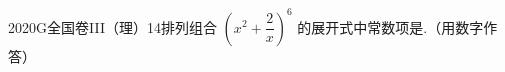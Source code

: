
\begin{problem}{2020}{G}{全国卷III（理）}{14}{排列组合}
$ \left(x^2 + \dfrac{2}{x}\right)^6 $ 的展开式中常数项是\underline{\hspace{4em}}.（用数字作答）
\end{problem}

\begin{answer}

\end{answer}

\begin{solutions}

\end{solutions}